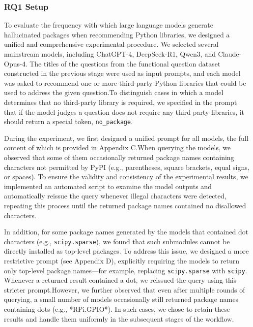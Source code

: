 \subsubsection{RQ1 Setup}
To evaluate the frequency with which large language models generate hallucinated packages when recommending Python libraries, we designed a unified and comprehensive 
experimental procedure. We selected several mainstream models, including ChatGPT-4, DeepSeek-R1, Qwen3, and Claude-Opus-4. The titles of the questions from 
the functional question dataset constructed in the previous stage were used as input prompts, and each model was asked to recommend one or more third-party Python 
libraries that could be used to address the given question.To distinguish cases in which a model determines that no third-party library is required, we specified in 
the prompt that if the model judges a question does not require any third-party libraries, it should return a special token, \texttt{no\_package}.

During the experiment, we first designed a unified prompt for all models, the full content of which is provided in Appendix C.When querying the models, we observed 
that some of them occasionally returned package names containing characters not permitted by PyPI (e.g., parentheses, square brackets, equal signs, or spaces). To 
ensure the validity and consistency of the experimental results, we implemented an automated script to examine the model outputs and automatically reissue the query 
whenever illegal characters were detected, repeating this process until the returned package names contained no disallowed characters.

In addition, for some package names generated by the models that contained dot characters (e.g., \texttt{scipy.sparse}), we found that such submodules cannot be directly 
installed as top-level packages. To address this issue, we designed a more restrictive prompt (see Appendix D), explicitly requiring the models to return only 
top-level package names—for example, replacing \texttt{scipy.sparse} with \texttt{scipy}. Whenever a returned result contained a dot, we reissued the query using this stricter 
prompt.However, we further observed that even after multiple rounds of querying, a small number of models occasionally still returned package names containing 
dots (e.g., *RPi.GPIO*). In such cases, we chose to retain these results and handle them uniformly in the subsequent stages of the workflow.

